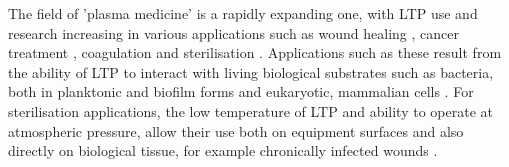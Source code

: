 \documentclass[11pt, oneside]{article}   	%
\newcommand{\todo}[1]{ \textcolor{red}{\bf{To Do:} #1}}
\begin{document}
The field of 'plasma medicine' is a rapidly expanding one, with LTP use and research increasing in various applications such as wound healing \cite{Haertel2014nonthermal, Isbary2013nonthermal}, cancer treatment \cite{Hirst2016low, Fridman2007floating}, coagulation \cite{Fridman2006blood, Chen2009blood} and sterilisation \cite{Fridman2006blood, Laroussi2002nonthermal}.
Applications such as these result from the ability of LTP to interact with living biological substrates such as bacteria, both in planktonic and biofilm forms \cite{Joshi2010control, Pei2012inactivation, Ziuzina2015cold} and eukaryotic, mammalian cells \cite{Haertel2014nonthermal}.
For sterilisation applications, the low temperature of LTP and ability to operate at atmospheric pressure, allow their use both on equipment surfaces \cite{Laroussi2002nonthermal} and also directly on biological tissue, for example chronically infected wounds \cite{Haertel2014nonthermal, Isbary2013nonthermal, Fridman2006blood}.
%
\end{document}
